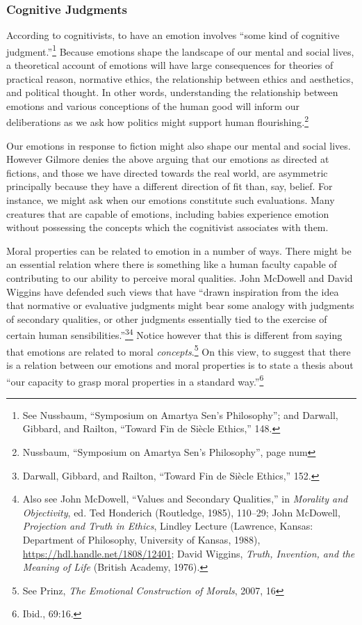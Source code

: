 \documentclass[phdthesis,12pt,final,a4paper]{wuthesis}
\theoremstyle{definition}
\theoremstyle{definition}
\theoremstyle{definition}
\theoremstyle{definition}
\theoremstyle{remark}
\begin{document}
\subsubsection*{Cognitive Judgments}\label{cognitive-judgments}

According to cognitivists, to have an emotion involves ``some kind of cognitive judgment.''\footnote{See Nussbaum, {``Symposium on {Amartya Sen}'s Philosophy''}; and Darwall, Gibbard, and Railton, {``Toward Fin de Siècle Ethics,''} 148.} Because emotions shape the landscape of our mental and social lives, a theoretical account of emotions will have large consequences for theories of practical reason, normative ethics, the relationship between ethics and aesthetics, and political thought. In other words, understanding the relationship between emotions and various conceptions of the human good will inform our deliberations as we ask how politics might support human flourishing.\footnote{Nussbaum, {``Symposium on {Amartya Sen}'s Philosophy''}, page num}

Our emotions in response to fiction might also shape our mental and social lives. However Gilmore denies the above arguing that our emotions as directed at fictions, and those we have directed towards the real world, are asymmetric principally because they have a different direction of fit than, say, belief. For instance, we might ask when our emotions constitute such evaluations. Many creatures that are capable of emotions, including babies experience emotion without possessing the concepts which the cognitivist associates with them.

Moral properties can be related to emotion in a number of ways. There might be an essential relation where there is something like a human faculty capable of contributing to our ability to perceive moral qualities. John McDowell and David Wiggins have defended such views that have ``drawn inspiration from the idea that normative or evaluative judgments might bear some analogy with judgments of secondary qualities, or other judgments essentially tied to the exercise of certain human sensibilities.''\footnote{Darwall, Gibbard, and Railton, {``Toward Fin de Siècle Ethics,''} 152.}\footnote{Also see John McDowell, {``Values and {Secondary Qualities},''} in \emph{Morality and {Objectivity}}, ed. Ted Honderich (Routledge, 1985), 110--29; John McDowell, \emph{Projection and {Truth} in {Ethics}}, Lindley Lecture (Lawrence, Kansas: Department of Philosophy, University of Kansas, 1988), \url{https://hdl.handle.net/1808/12401}; David Wiggins, \emph{Truth, {Invention}, and the {Meaning} of {Life}} (British Academy, 1976).} Notice however that this is different from saying that emotions are related to moral \emph{concepts}.\footnote{See Prinz, \emph{The {Emotional Construction} of {Morals}}, 2007, 16} On this view, to suggest that there is a relation between our emotions and moral properties is to state a thesis about ``our capacity to grasp moral properties in a standard way.''\footnote{Ibid., 69:16.}
\end{document}
